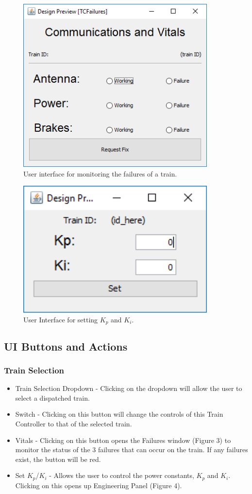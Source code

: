 \documentclass[letterpaper]{article}
\begin{document}
\begin{figure}[h!]
	\center
	\includegraphics[width=10cm]{traincontroller_failurepanel.PNG}
	\caption{User interface for monitoring the failures of a train.}
\end{figure}

\begin{figure}[h!]
	\center
	\includegraphics[width=10cm]{traincontroller_engineerpanel.PNG}
	\caption{User Interface for setting $K_p$ and $K_i$.}
\end{figure}

\subsection{UI Buttons and Actions}

	\subsubsection{Train Selection}
		\begin{itemize}
			\item Train Selection Dropdown - Clicking on the dropdown will allow the user to select a dispatched train.
			\item Switch - Clicking on this button will change the controls of this Train Controller to that of the selected train. 
			\item Vitals - Clicking on this button opens the Failures window (Figure 3) to monitor the status of the 3 failures that can occur on the train. If any failures exist, the button will be red.
			\item Set $K_p$/$K_i$ - Allows the user to control the power constants, $K_p$ and $K_i$. Clicking on this opens up Engineering Panel (Figure 4).
		\end{itemize}
\end{document}
